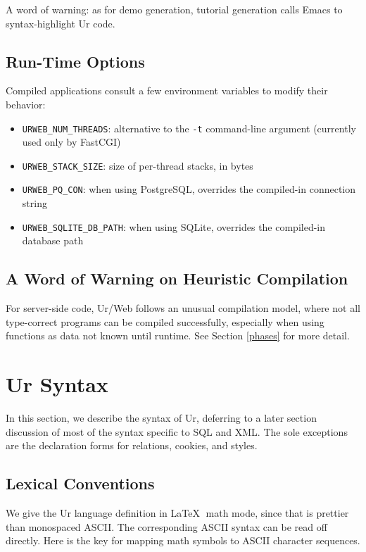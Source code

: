 \documentclass{article}
\newcommand{\cd}[1]{\texttt{#1}}
\begin{document}
A word of warning: as for demo generation, tutorial generation calls Emacs to syntax-highlight Ur code.

\subsection{Run-Time Options}

Compiled applications consult a few environment variables to modify their behavior:

\begin{itemize}
  \item \cd{URWEB\_NUM\_THREADS}: alternative to the \cd{-t} command-line argument (currently used only by FastCGI)
  \item \cd{URWEB\_STACK\_SIZE}: size of per-thread stacks, in bytes
  \item \cd{URWEB\_PQ\_CON}: when using PostgreSQL, overrides the compiled-in connection string
  \item \cd{URWEB\_SQLITE\_DB\_PATH}: when using SQLite, overrides the compiled-in database path
\end{itemize}

\subsection{A Word of Warning on Heuristic Compilation}

For server-side code, Ur/Web follows an unusual compilation model, where not all type-correct programs can be compiled successfully, especially when using functions as data not known until runtime.  See Section \ref{phases} for more detail.


\section{Ur Syntax}

In this section, we describe the syntax of Ur, deferring to a later section discussion of most of the syntax specific to SQL and XML.  The sole exceptions are the declaration forms for relations, cookies, and styles.

\subsection{Lexical Conventions}

We give the Ur language definition in \LaTeX $\;$ math mode, since that is prettier than monospaced ASCII.  The corresponding ASCII syntax can be read off directly.  Here is the key for mapping math symbols to ASCII character sequences.
\end{document}
